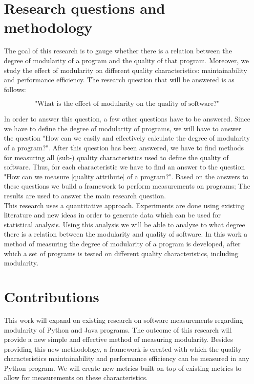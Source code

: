 \documentclass[twoside]{uva-inf-bachelor-thesis}
\begin{document}
\section{Research questions and methodology}
The goal of this research is to gauge whether there is a relation between the degree of modularity of a program and the quality of that program. Moreover, we study the effect of modularity on different quality characteristics: maintainability and performance efficiency. The research question that will be answered is as follows:

\[ \text{"What is the effect of modularity on the quality of software?"} \]

In order to answer this question, a few other questions have to be answered. Since we have to define the degree of modularity of programs, we will have to answer the question "How can we easily and effectively calculate the degree of modularity of a program?". After this question has been answered, we have to find methods for measuring all (sub-) quality characteristics used to define the quality of software. Thus, for each characteristic we have to find an answer to the question "How can we measure [quality attribute] of a program?". Based on the answers to these questions we build a framework to perform measurements on programs; The results are used to answer the main research question.\\

This research uses a quantitative approach. Experiments are done using existing literature and new ideas in order to generate data which can be used for statistical analysis. Using this analysis we will be able to analyze to what degree there is a relation between the modularity and quality of software. In this work a method of measuring the degree of modularity of a program is developed, after which a set of programs is tested on different quality characteristics, including modularity.

\section{Contributions}
This work will expand on existing research on software measurements regarding modularity\cite{BetterCodeHub,visser2016building,emanuel2013modularity} of Python and Java programs. The outcome of this research will provide a new simple and effective method of measuring modularity. Besides providing this new methodology, a framework is created with which the quality characteristics maintainability and performance efficiency can be measured in any Python program. We will create new metrics built on top of existing metrics\cite{heitlager2016practical} to allow for measurements on these characteristics.
\end{document}

